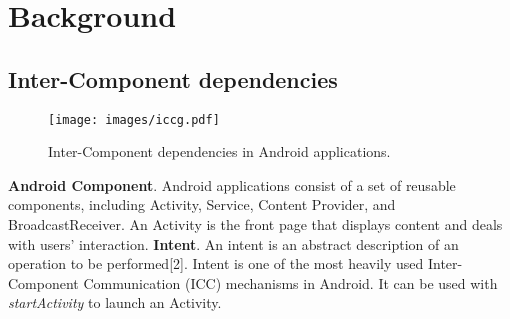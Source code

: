 \section{Background}
\label{sec:background}



\subsection{Inter-Component dependencies}

\begin{figure}
    \texttt{[image: images/iccg.pdf]}
    \caption{Inter-Component dependencies in Android applications.} \label{fig:atg}
\end{figure}


\textbf{Android Component}. Android applications consist of a set of reusable components, including Activity, Service, Content Provider, and BroadcastReceiver. An Activity is the front page that displays content and deals with users’ interaction. 
\textbf{Intent}. An intent is an abstract description of an operation to be performed[2]. Intent is one of the most heavily used Inter-Component Communication (ICC) mechanisms in Android. It can be used with \textit{startActivity} to launch an Activity.


